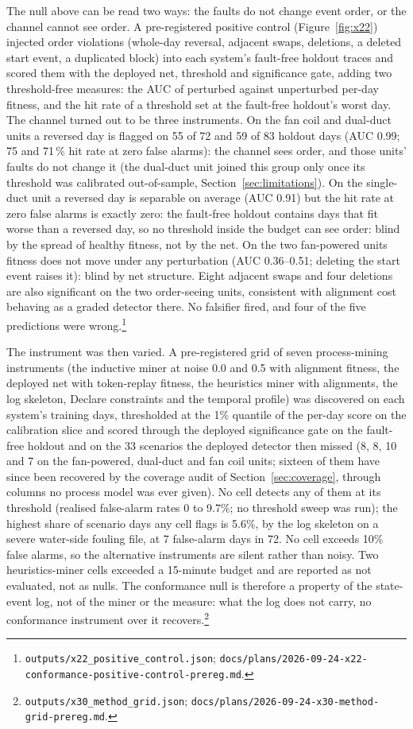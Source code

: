\documentclass[11pt,letterpaper]{article}
\begin{document}
The null above can be read two ways: the faults do not change event order, or the channel cannot see order. A pre-registered positive control (Figure~\ref{fig:x22}) injected order violations (whole-day reversal, adjacent swaps, deletions, a deleted start event, a duplicated block) into each system's fault-free holdout traces and scored them with the deployed net, threshold and significance gate, adding two threshold-free measures: the AUC of perturbed against unperturbed per-day fitness, and the hit rate of a threshold set at the fault-free holdout's worst day. The channel turned out to be three instruments. On the fan coil and dual-duct units a reversed day is flagged on 55 of 72 and 59 of 83 holdout days (AUC 0.99; 75 and 71\,\% hit rate at zero false alarms): the channel sees order, and those units' faults do not change it (the dual-duct unit joined this group only once its threshold was calibrated out-of-sample, Section~\ref{sec:limitations}). On the single-duct unit a reversed day is separable on average (AUC 0.91) but the hit rate at zero false alarms is exactly zero: the fault-free holdout contains days that fit worse than a reversed day, so no threshold inside the budget can see order: blind by the spread of healthy fitness, not by the net. On the two fan-powered units fitness does not move under any perturbation (AUC 0.36--0.51; deleting the start event raises it): blind by net structure. Eight adjacent swaps and four deletions are also significant on the two order-seeing units, consistent with alignment cost behaving as a graded detector there. No falsifier fired, and four of the five predictions were wrong.\footnote{\texttt{outputs/x22\_positive\_control.json}; \texttt{docs/plans/2026-09-24-x22-conformance-positive-control-prereg.md}.}

The instrument was then varied. A pre-registered grid of seven process-mining instruments (the inductive miner at noise 0.0 and 0.5 with alignment fitness, the deployed net with token-replay fitness, the heuristics miner with alignments, the log skeleton, Declare constraints and the temporal profile) was discovered on each system's training days, thresholded at the 1\% quantile of the per-day score on the calibration slice and scored through the deployed significance gate on the fault-free holdout and on the 33 scenarios the deployed detector then missed (8, 8, 10 and 7 on the fan-powered, dual-duct and fan coil units; sixteen of them have since been recovered by the coverage audit of Section~\ref{sec:coverage}, through columns no process model was ever given). No cell detects any of them at its threshold (realised false-alarm rates 0 to 9.7\%; no threshold sweep was run); the highest share of scenario days any cell flags is 5.6\%, by the log skeleton on a severe water-side fouling file, at 7 false-alarm days in 72. No cell exceeds 10\% false alarms, so the alternative instruments are silent rather than noisy. Two heuristics-miner cells exceeded a 15-minute budget and are reported as not evaluated, not as nulls. The conformance null is therefore a property of the state-event log, not of the miner or the measure: what the log does not carry, no conformance instrument over it recovers.\footnote{\texttt{outputs/x30\_method\_grid.json}; \texttt{docs/plans/2026-09-24-x30-method-grid-prereg.md}.}
\end{document}
